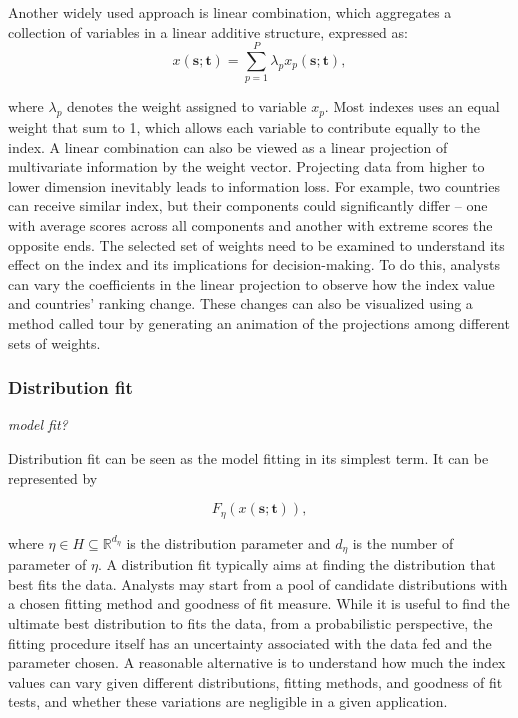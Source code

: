 \documentclass[
]{interact}
\begin{document}
Another widely used approach is linear combination, which aggregates a
collection of variables in a linear additive structure, expressed as:
\[x(\mathbf{s}; \mathbf{t}) = \sum_{p = 1}^{P}\lambda_{p}x_p(\mathbf{s};\mathbf{t}),\]

where \(\lambda_p\) denotes the weight assigned to variable \(x_p\).
Most indexes uses an equal weight that sum to 1, which allows each
variable to contribute equally to the index. A linear combination can
also be viewed as a linear projection of multivariate information by the
weight vector. Projecting data from higher to lower dimension inevitably
leads to information loss. For example, two countries can receive
similar index, but their components could significantly differ -- one
with average scores across all components and another with extreme
scores the opposite ends. The selected set of weights need to be
examined to understand its effect on the index and its implications for
decision-making. To do this, analysts can vary the coefficients in the
linear projection to observe how the index value and countries' ranking
change. These changes can also be visualized using a method called tour
by generating an animation of the projections among different sets of
weights.

\hypertarget{distribution-fit}{%
\subsubsection{Distribution fit}\label{distribution-fit}}

\emph{model fit? }

Distribution fit can be seen as the model fitting in its simplest term.
It can be represented by

\begin{equation}
F_{\eta}(x(\mathbf{s}; \mathbf{t})), 
\end{equation}

where \(\eta \in H \subseteq \mathbb{R}^{d_{\eta}}\) is the distribution
parameter and \(d_{\eta}\) is the number of parameter of \(\eta\). A
distribution fit typically aims at finding the distribution that best
fits the data. Analysts may start from a pool of candidate distributions
with a chosen fitting method and goodness of fit measure. While it is
useful to find the ultimate best distribution to fits the data, from a
probabilistic perspective, the fitting procedure itself has an
uncertainty associated with the data fed and the parameter chosen. A
reasonable alternative is to understand how much the index values can
vary given different distributions, fitting methods, and goodness of fit
tests, and whether these variations are negligible in a given
application.
\end{document}
